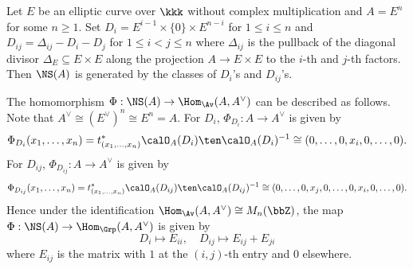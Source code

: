     \begin{example}\label{eg:NS_E^n_in_hom_E^n_E^n}
        Let \(E\) be an elliptic curve over \(\kkk\) without complex multiplication and \(A = E^n\) for some \(n \geq 1\).
        Set \(D_i = E^{i-1} \times \{0\} \times E^{n-i}\) for \(1 \leq i \leq n\) and \(D_{ij} = \Delta_{ij} - D_i - D_j\) for \(1 \leq i < j \leq n\) where \(\Delta_{ij}\) is the pullback of the diagonal divisor \(\Delta_E \subseteq E \times E\) along the projection \(A \to E \times E\) to the \(i\)-th and \(j\)-th factors.
        Then \(\NS(A)\) is generated by the classes of \(D_i\)'s and \(D_{ij}\)'s.

        The homomorphism \(\Phi: \NS(A) \to \Hom_{\Av}(A, A^\vee)\) can be described as follows.
        Note that \(A^\vee \cong (E^\vee)^n \cong E^n = A\).
        For \(D_i\), \(\Phi_{D_i}: A \to A^\vee\) is given by
        \[ \Phi_{D_i}(x_1, \ldots, x_n) = t_{(x_1, \ldots, x_n)}^* \calO_A(D_i) \ten \calO_A(D_i)^{-1} \cong (0, \ldots, 0, x_i, 0, \ldots, 0). \]
        For \(D_{ij}\), \(\Phi_{D_{ij}}: A \to A^\vee\) is given by
        \[ \Phi_{D_{ij}}(x_1, \ldots, x_n) = t_{(x_1, \ldots, x_n)}^* \calO_A(D_{ij}) \ten \calO_A(D_{ij})^{-1} \cong (0, \ldots, 0, x_j, 0, \ldots, 0, x_i, 0, \ldots, 0). \]
        Hence under the identification \(\Hom_{\Av}(A, A^\vee) \cong M_n(\bbZ)\), the map \(\Phi: \NS(A) \to \Hom_{\Grp}(A, A^\vee)\) is given by
        \[ D_i \mapsto E_{ii}, \quad D_{ij} \mapsto E_{ij} + E_{ji} \]
        where \(E_{ij}\) is the matrix with \(1\) at the \((i,j)\)-th entry and \(0\) elsewhere.
    \end{example}
